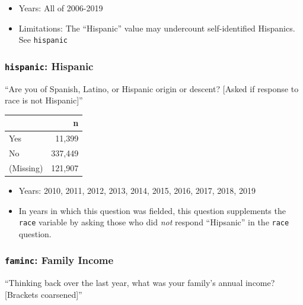 \documentclass[10pt,article,oneside]{memoir}
\theoremstyle{definition}
\begin{document}
\begin{itemize}
\tightlist
\item
  Years: All of 2006-2019
\item
  Limitations: The ``Hispanic'' value may undercount self-identified
  Hispanics. See \texttt{hispanic}
\end{itemize}

\hypertarget{hispanic-hispanic}{%
\subsubsection{\texorpdfstring{\texttt{hispanic}:
Hispanic}{hispanic: Hispanic}}\label{hispanic-hispanic}}

``Are you of Spanish, Latino, or Hispanic origin or descent? {[}Asked if
response to race is not Hispanic{]}''

\begin{table}[H]
\centering
\begin{tabular}{lr}
\toprule
 & n\\
\midrule
Yes & 11,399\\
No & 337,449\\
(Missing) & 121,907\\
\bottomrule
\end{tabular}
\end{table}

\begin{itemize}
\tightlist
\item
  Years: 2010, 2011, 2012, 2013, 2014, 2015, 2016, 2017, 2018, 2019
\item
  In years in which this question was fielded, this question supplements
  the \texttt{race} variable by asking those who did \emph{not} respond
  ``Hipsanic'' in the \texttt{race} question.
\end{itemize}

\hypertarget{faminc-family-income}{%
\subsubsection{\texorpdfstring{\texttt{faminc}: Family
Income}{faminc: Family Income}}\label{faminc-family-income}}

``Thinking back over the last year, what was your family's annual
income? {[}Brackets coarsened{]}''
\end{document}
